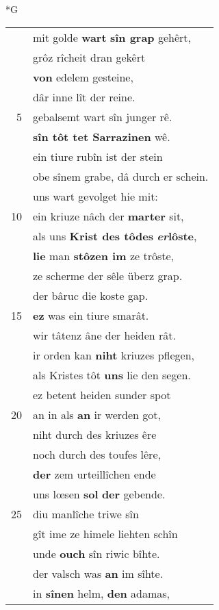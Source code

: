 \documentclass[8pt,a4paper,notitlepage]{article}
\begin{document}
\begin{table}[ht]
\begin{minipage}[t]{0.5\linewidth}
\small
\begin{center}*G
\end{center}
\begin{tabular}{rl}
 & mit golde \textbf{wart} \textbf{sîn grap} gehêrt,\\ 
 & grôz rîcheit dran gekêrt\\ 
 & \textbf{von} edelem gesteine,\\ 
 & dâr inne lît der reine.\\ 
5 & gebalsemt wart sîn junger rê.\\ 
 & \textbf{sîn tôt tet Sarrazinen} wê.\\ 
 & ein tiure rubîn ist der stein\\ 
 & obe sînem grabe, dâ durch er schein.\\ 
 & uns wart gevolget hie mit:\\ 
10 & ein kriuze nâch der \textbf{marter} sit,\\ 
 & als uns \textbf{Krist des tôdes} \textbf{\textit{er}lôste},\\ 
 & \textbf{lie} man \textbf{stôzen im} ze trôste,\\ 
 & ze scherme der sêle überz grap.\\ 
 & der bâruc die koste gap.\\ 
15 & \textbf{ez} was ein tiure smarât.\\ 
 & wir tâtenz âne der heiden rât.\\ 
 & ir orden kan \textbf{niht} kriuzes pflegen,\\ 
 & als Kristes tôt \textbf{uns} lie den segen.\\ 
 & ez betent heiden sunder spot\\ 
20 & an in als \textbf{an} ir werden got,\\ 
 & niht durch des kriuzes êre\\ 
 & noch durch des toufes lêre,\\ 
 & \textbf{der} zem urteillîchen ende\\ 
 & uns lœsen \textbf{sol} \textbf{der} gebende.\\ 
25 & diu manlîche triwe sîn\\ 
 & gît ime ze himele liehten schîn\\ 
 & unde \textbf{ouch} sîn riwic bîhte.\\ 
 & der valsch was \textbf{an} im sîhte.\\ 
 & in \textbf{sînen} helm, \textbf{den} adamas,\\ 

\end{tabular}
\end{minipage}
\end{table}
\end{document}
